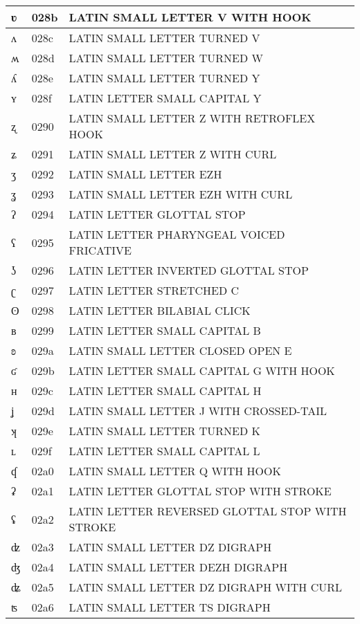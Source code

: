 \documentclass[12pt,letterpaper,openany]{book}
\begin{document}
\begin{center}
\begin{supertabular}{|m{0.25in}|m{0.5in}|m{4in}|}
			ʋ & 028b & LATIN SMALL LETTER V WITH HOOK\\\hline
			ʌ & 028c & LATIN SMALL LETTER TURNED V\\\hline
			ʍ & 028d & LATIN SMALL LETTER TURNED W\\\hline
			ʎ & 028e & LATIN SMALL LETTER TURNED Y\\\hline
			ʏ & 028f & LATIN LETTER SMALL CAPITAL Y\\\hline
			ʐ & 0290 & LATIN SMALL LETTER Z WITH RETROFLEX HOOK\\\hline
			ʑ & 0291 & LATIN SMALL LETTER Z WITH CURL\\\hline
			ʒ & 0292 & LATIN SMALL LETTER EZH\\\hline
			ʓ & 0293 & LATIN SMALL LETTER EZH WITH CURL\\\hline
			ʔ & 0294 & LATIN LETTER GLOTTAL STOP\\\hline
			ʕ & 0295 & LATIN LETTER PHARYNGEAL VOICED FRICATIVE\\\hline
			ʖ & 0296 & LATIN LETTER INVERTED GLOTTAL STOP\\\hline
			ʗ & 0297 & LATIN LETTER STRETCHED C\\\hline
			ʘ & 0298 & LATIN LETTER BILABIAL CLICK\\\hline
			ʙ & 0299 & LATIN LETTER SMALL CAPITAL B\\\hline
			ʚ & 029a & LATIN SMALL LETTER CLOSED OPEN E\\\hline
			ʛ & 029b & LATIN LETTER SMALL CAPITAL G WITH HOOK\\\hline
			ʜ & 029c & LATIN LETTER SMALL CAPITAL H\\\hline
			ʝ & 029d & LATIN SMALL LETTER J WITH CROSSED-TAIL\\\hline
			ʞ & 029e & LATIN SMALL LETTER TURNED K\\\hline
			ʟ & 029f & LATIN LETTER SMALL CAPITAL L\\\hline
			ʠ & 02a0 & LATIN SMALL LETTER Q WITH HOOK\\\hline
			ʡ & 02a1 & LATIN LETTER GLOTTAL STOP WITH STROKE\\\hline
			ʢ & 02a2 & LATIN LETTER REVERSED GLOTTAL STOP WITH STROKE\\\hline
			ʣ & 02a3 & LATIN SMALL LETTER DZ DIGRAPH\\\hline
			ʤ & 02a4 & LATIN SMALL LETTER DEZH DIGRAPH\\\hline
			ʥ & 02a5 & LATIN SMALL LETTER DZ DIGRAPH WITH CURL\\\hline
			ʦ & 02a6 & LATIN SMALL LETTER TS DIGRAPH\\\hline

\end{supertabular}
\end{center}
\end{document}

